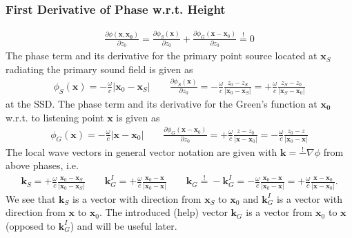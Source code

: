 \documentclass[a4paper,BCOR=15mm,10pt,twoside]{scrartcl}
\newcommand\wc{\frac{\omega}{c}}  %
\renewcommand{\vec}[1]{\mathbf{#1}}  %
\begin{document}
\subsubsection{First Derivative of Phase w.r.t. Height}
%
\begin{align}
\label{eq:PhaseSGDer1Condition}
\frac{\partial \phi(\vec{x}, \vec{x_0})}{\partial z_0} = \frac{\partial \phi_{S}(\vec{x})}{\partial z_0}   + \frac{\partial \phi_{G}(\vec{x}-\vec{x}_0)}{\partial z_0} \stackrel{!}{=} 0
\end{align}
%
The phase term and its derivative for the primary point source located at $\vec{x}_S$ radiating the primary sound field is given as
\begin{align}
\phi_{S}(\vec{x}) = -\wc |\vec{x}_0-\vec{x}_S|\qquad \frac{\partial \phi_{S}(\vec{x})}{\partial z_0} = - \wc \frac{z_0-z_S}{|\vec{x}_0-\vec{x}_S|} = + \wc \frac{z_S-z_0}{|\vec{x}_S-\vec{x}_0|}
\end{align}
at the SSD.
The phase term and its derivative for the Green's function at $\vec{x_0}$ w.r.t. to listening point $\vec{x}$ is given as
\begin{align}
\phi_{G}(\vec{x}) = -\wc |\vec{x}-\vec{x}_0| \qquad \frac{\partial \phi_{G}(\vec{x}-\vec{x}_0)}{\partial z_0} = +\wc \frac{z-z_0}{|\vec{x}-\vec{x}_0|} = -\wc \frac{z_0-z}{|\vec{x}_0-\vec{x}|}
\end{align}
The local wave vectors in general vector notation are given with $\vec{k} = \stackrel{!}{-} \nabla \phi$ from above phases, i.e.
\begin{align}
\label{eq:WaveVectorsSPA1}
\vec{k}_S = + \wc \frac{\vec{x}_0-\vec{x}_S}{|\vec{x}_0-\vec{x}_S|}
\qquad \vec{k}_G^I = + \wc \frac{\vec{x}_0-\vec{x}}{|\vec{x}_0-\vec{x}|}
\qquad \vec{k}_G \stackrel{!}{=} - \vec{k}_G^I = - \wc \frac{\vec{x}_0-\vec{x}}{|\vec{x}_0-\vec{x}|} = + \wc \frac{\vec{x}-\vec{x}_0}{|\vec{x}-\vec{x}_0|}.
\end{align}
We see that $\vec{k}_S $ is a vector with direction from $\vec{x}_S$ to $\vec{x}_0$ and $\vec{k}_G^I$ is a vector with direction from $\vec{x}$ to $\vec{x}_0$. The introduced (help) vector 
$\vec{k}_G$ is a vector from $\vec{x}_0$ to $\vec{x}$ (opposed to $\vec{k}_G^I $) and will be useful later.
\end{document}
